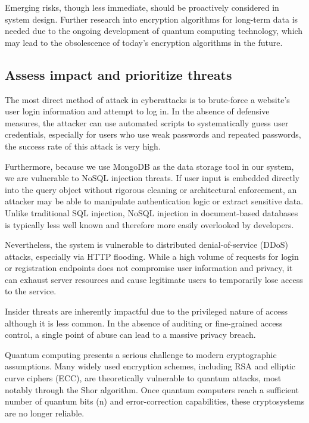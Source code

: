 \documentclass{article}
\begin{document}
Emerging risks, though less immediate, should be proactively considered in system design. Further research into encryption algorithms for long-term data is needed due to the ongoing development of quantum computing technology, which may lead to the obsolescence of today's encryption algorithms in the future.

\subsection{Assess impact and prioritize threats}
The most direct method of attack in cyberattacks is to brute-force a website's user login information and attempt to log in. In the absence of defensive measures, the attacker can use automated scripts to systematically guess user credentials, especially for users who use weak passwords and repeated passwords, the success rate of this attack is very high. 

Furthermore, because we use MongoDB as the data storage tool in our system, we are vulnerable to NoSQL injection threats. If user input is embedded directly into the query object without rigorous cleaning or architectural enforcement, an attacker may be able to manipulate authentication logic or extract sensitive data. Unlike traditional SQL injection, NoSQL injection in document-based databases is typically less well known and therefore more easily overlooked by developers. 

Nevertheless, the system is vulnerable to distributed denial-of-service (DDoS) attacks, especially via HTTP flooding. While a high volume of requests for login or registration endpoints does not compromise user information and privacy, it can exhaust server resources and cause legitimate users to temporarily lose access to the service. 

Insider threats are inherently impactful due to the privileged nature of access although it is less common. In the absence of auditing or fine-grained access control, a single point of abuse can lead to a massive privacy breach.

Quantum computing presents a serious challenge to modern cryptographic assumptions. Many widely used encryption schemes, including RSA\cite{inbook} and elliptic curve ciphers (ECC)\cite{Koblitz1987}, are theoretically vulnerable to quantum attacks, most notably through the Shor algorithm\cite{365700}. Once quantum computers reach a sufficient number of quantum bits (n) and error-correction capabilities, these cryptosystems are no longer reliable.
\end{document}
